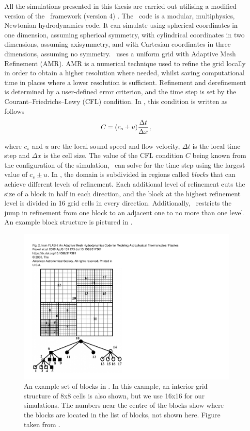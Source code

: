 All the simulations presented in this thesis are carried out utilising a modified version of the \flash\ framework (version 4) \citep{Fryxell2000, Dubey2009}. The \flash\ code is a modular, multiphysics, Newtonian hydrodynamics code. It can simulate using spherical coordinates in one dimension, assuming spherical symmetry, with cylindrical coordinates in two dimensions, assuming axisymmetry, and with Cartesian coordinates in three dimensions, assuming no symmetry. \flash\ uses a uniform grid with Adaptive Mesh Refinement (AMR). AMR is a numerical technique used to refine the grid locally in order to obtain a higher resolution where needed, whilst saving computational time in places where a lower resolution is sufficient. Refinement and derefinement is determined by a user-defined error criterion, and the time step is set by the Courant–Friedrichs–Lewy (CFL) condition. In \flash, this condition is written as follows
\begin{equation}
    C = (c_s \pm u) \frac{\Delta t}{\Delta x} \,\mathrm{,}
\end{equation}

where \(c_s\) and \(u\) are the local sound speed and flow velocity, \(\Delta t\) is the local time step and \(\Delta x\) is the cell size. The value of the CFL condition \(C\) being known from the configuration of the simulation, \flash\ can solve for the time step using the largest value of \(c_s \pm u\). In \flash, the domain is subdivided in regions called \emph{blocks} that can achieve different levels of refinement. Each additional level of refinement cuts the size of a block in half in each direction, and the block at the highest refinement level is divided in 16 grid cells in every direction. Additionally, \flash\ restricts the jump in refinement from one block to an adjacent one to no more than one level. An example block structure is pictured in .

\begin{figure}[ht!]
    \centering
    \includegraphics[width=0.55\linewidth]{figures/flash_blocks.pdf}
    \caption{An example set of blocks in \flash. In this example, an interior grid structure of 8x8 cells is also shown, but we use 16x16 for our simulations. The numbers near the centre of the blocks show where the blocks are located in the list of blocks, not shown here. Figure taken from \cite{Fryxell2000}.}
    \label{fig:flash_blocks}
\end{figure}

